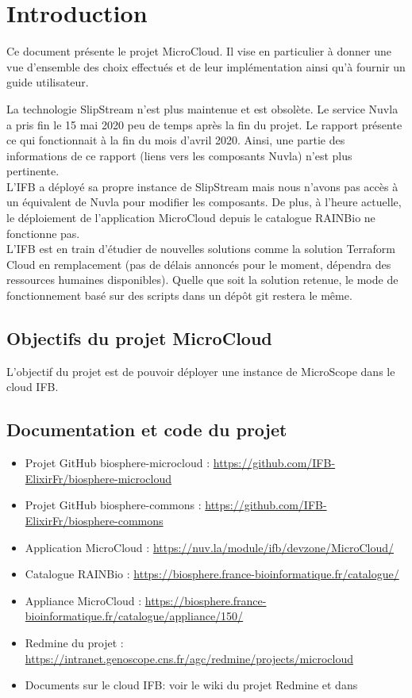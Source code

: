 \chapter{Introduction}

Ce document présente le projet MicroCloud.
Il vise en particulier à donner une vue d'ensemble des choix effectués
et de leur implémentation ainsi qu'à fournir un guide utilisateur.

\begin{mycolorbox}
	La technologie SlipStream n'est plus maintenue et est obsolète.
	Le service Nuvla a pris fin le 15 mai 2020 peu de temps après la fin du projet.
	Le rapport présente ce qui fonctionnait à la fin du mois d'avril 2020.
	Ainsi, une partie des informations de ce rapport (liens vers les composants Nuvla) n'est plus pertinente.\\
	L'IFB a déployé sa propre instance de SlipStream mais nous n'avons pas accès à un équivalent de Nuvla pour modifier les composants.
	De plus, à l'heure actuelle, le déploiement de l'application MicroCloud depuis le catalogue RAINBio ne fonctionne pas.\\
	L'IFB est en train d'étudier de nouvelles solutions comme la solution Terraform Cloud en remplacement (pas de délais annoncés pour le moment, dépendra des ressources humaines disponibles). Quelle que soit la solution retenue, le mode de fonctionnement basé sur des scripts dans un dépôt git restera le même.
\end{mycolorbox}

\section{Objectifs du projet MicroCloud}

L'objectif du projet est de pouvoir déployer une instance de MicroScope dans le cloud IFB.

\section{Documentation et code du projet}

\begin{itemize}
	\item Projet GitHub biosphere-microcloud : \url{https://github.com/IFB-ElixirFr/biosphere-microcloud}
	\item Projet GitHub biosphere-commons : \url{https://github.com/IFB-ElixirFr/biosphere-commons}
	\item Application MicroCloud : \url{https://nuv.la/module/ifb/devzone/MicroCloud/}
	\item Catalogue RAINBio : \url{https://biosphere.france-bioinformatique.fr/catalogue/}
	\item Appliance MicroCloud : \url{https://biosphere.france-bioinformatique.fr/catalogue/appliance/150/}
	\item Redmine du projet : \url{https://intranet.genoscope.cns.fr/agc/redmine/projects/microcloud} 
	\item Documents sur le cloud IFB: voir le wiki du projet Redmine et dans 
\end{itemize}

